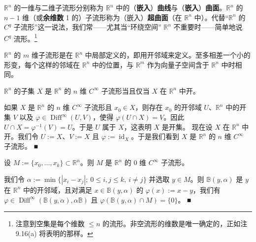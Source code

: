 $ \mathbb{R}^{n} $ 的一维与二维子流形分别称为 $ \mathbb{R}^{n} $ 中的（\textbf{嵌入}）\textbf{曲线}与（\textbf{嵌入}）\textbf{曲面}。$ \mathbb{R}^{n} $ 的 $ n - 1 $ 维（或\textbf{余维数} 1 的）子流形称为（嵌入）\textbf{超曲面}（在 $ \mathbb{R}^{n} $ 中）。代替“$ \mathbb{R}^{n} $ 的 $ C^{q} $ 子流形”这一说法，我们常——尤其当“环绕空间” $ \mathbb{R}^{n} $ 不重要时——简单地说 $ C^{q} $ 流形。\footnote{注意到空集是每个维数 $ \le n $ 的流形。非空流形的维数是唯一确定的，正如注 9.16(a) 将表明的那样。}

$ \mathbb{R}^{n} $ 的 $ m $ 维子流形是在 $ \mathbb{R}^{n} $ 中局部定义的，即用开邻域来定义。至多相差一个小的形变，每个这样的邻域在 $ \mathbb{R}^{n} $ 中的位置，与 $ \mathbb{R}^{m} $ 作为向量子空间含于 $ \mathbb{R}^{n} $ 中时相同。

\begin{example}

\begin{items}
\item

$ \mathbb{R}^{n} $ 的子集 $ X $ 是 $ \mathbb{R}^{n} $ 的 $ n $ 维 $ C^{\infty} $ 子流形当且仅当 $ X $ 在 $ \mathbb{R}^{n} $ 中开。

\proofhead
如果 $ X $ 是 $ \mathbb{R}^{n} $ 的 $ n $ 维 $ C^{\infty} $ 子流形且 $ x_{0} \in X $，则存在 $ x_{0} $ 的开邻域 $ U $、$ \mathbb{R}^{n} $ 中的开集 $ V $ 以及 $ \varphi \in \operatorname{Diff}^{\infty}(U, V) $，使得 $ \varphi(U \cap X) = V $。因此 $ U \cap X = \varphi^{-1}(V) = U $。于是 $ U $ 属于 $ X $，这表明 $ X $ 是开集。
现在设 $ X $ 在 $ \mathbb{R}^{n} $ 中开。我们令 $ U := X $、$ V := X $ 且 $ \varphi := \operatorname{id}_{X} $。于是我们看到 $ X $ 是 $ \mathbb{R}^{n} $ 的 $ n $ 维 $ C^{\infty} $ 子流形。 \nobreak\hspace{0.35em}■
\item

设 $ M := \{x_{0}, \ldots, x_{k}\} \subset \mathbb{R}^{n} $。则 $ M $ 是 $ \mathbb{R}^{n} $ 的 0 维 $ C^{\infty} $ 子流形。

\proofhead
我们令 $ \alpha := \min\{|x_{i} - x_{j}| ; \ 0 \le i, j \le k, \ i \ne j\} $ 并选取 $ y \in M $。则 $ \mathbb{B}(y, \alpha) $ 是 $ y $ 在 $ \mathbb{R}^{n} $ 中的开邻域，且对满足 $ x \in \mathbb{B}(y, \alpha) $ 的 $ \varphi(x) := x - y $，我们有 $ \varphi \in \operatorname{Diff}^{\infty}(\mathbb{B}(y, \alpha), \alpha\mathbb{B}) $ 且 $ \varphi(\mathbb{B}(y, \alpha) \cap M) = \{0\} $。 \nobreak\hspace{0.35em}■
\item


\end{items}
\end{example}
